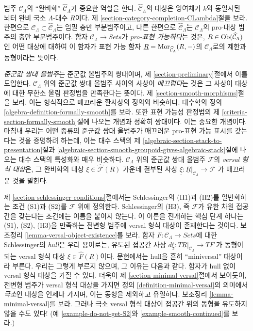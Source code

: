 \medskip\noindent
범주 $\mathcal{C}_\Lambda$의 ``완비화''
$\widehat{\mathcal{C}}_\Lambda$가 중요한 역할을 한다.
$\widehat{\mathcal{C}}_\Lambda$의 대상은 잉여체가 $k$와 동일시된 뇌터 완비
국소 $\Lambda$-대수 $R$이다. 제
\ref{section-category-completion-CLambda}절을 보라.
한편으로 $\mathcal{C}_\Lambda \subset \widehat{\mathcal{C}}_\Lambda$는
엄밀 충만 부분범주이고, 다른 한편으로
$\widehat{\mathcal{C}}_\Lambda$는 $\mathcal{C}_\Lambda$의
pro-대상 범주의 충만 부분범주이다. 함자
$\mathcal{C}_\Lambda \to \textit{Sets}$가 {\it pro-표현 가능하다}는 것은,
$R \in \mathop{\mathrm{Ob}}\nolimits(\widehat{\mathcal{C}}_\Lambda)$인 어떤 대상에 대하여 이 함자가
표현 가능 함자
$\underline{R} = \mathop{\mathrm{Mor}}\nolimits_{\widehat{\mathcal{C}}_\Lambda}(R, -)$의
$\mathcal{C}_\Lambda$로의 제한과 동형이라는 뜻이다.

\medskip\noindent
{\it 준군값 쌍대 올범주}는 준군값 올범주의 쌍대이며, 제
\ref{section-preliminary}절에서 이를 도입한다.
$\mathcal{C}_\Lambda$ 위의 준군값 쌍대 올범주 사이의 사상이
{\it 매끄럽다}는 것은 그 사상이 대상에 대한 무한소 올림 판정법을 만족한다는
뜻이다. 제 \ref{section-smooth-morphisms}절을 보라.
이는 형식적으로 매끄러운 환사상의 정의와 비슷하다. 대수학의 정의
\ref{algebra-definition-formally-smooth}를 보라. 또한 표현 가능성 판정법의
제 \ref{criteria-section-formally-smooth}절에 나오는 개념과 정확히 쌍대이다.
이는 중요한 개념이다. 마침내 우리는 어떤 종류의 준군값 쌍대 올범주가 매끄러운
pro-표현 가능 표시를 갖는다는 것을 증명하려 하는데, 이는 대수 스택의 제
\ref{algebraic-section-stack-to-presentation}절과
\ref{algebraic-section-smooth-groupoid-gives-algebraic-stack}절에 나오는
대수 스택의 특성화와 매우 비슷하다.
$\mathcal{C}_\Lambda$ 위의 준군값 쌍대 올범주 $\mathcal{F}$의
{\it versal 형식 대상}은, 그 완비화의 대상
$\xi \in \widehat{\mathcal{F}}(R)$ 가운데 결부된 사상
$\underline{\xi} : \underline{R}|_{\mathcal{C}_\Lambda} \to \mathcal{F}$
가 매끄러운 것을 말한다.

\medskip\noindent
제 \ref{section-schlessinger-conditions}절에서는 Schlessinger의
(H1)과 (H2)를 일반화하는 조건 (S1)과 (S2)를 $\mathcal{F}$ 위에 정의한다.
Schlessinger의 (H3), 즉 $\mathcal{F}$가 유한 차원 접공간을 갖는다는 조건에는
이름을 붙이지 않는다. 이 이론을 전개하는 핵심 단계 하나는 (S1), (S2), (H3)을
만족하는 전변형 범주에 versal 형식 대상이 존재한다는 것이다. 보조정리
\ref{lemma-versal-object-existence}를 보라.
함자 $F : \mathcal{C}_\Lambda \to \textit{Sets}$에 대한 Schlessinger의
{\it hull}은 우리 용어로는, 유도된 접공간 사상
$d\underline{\xi} : T\underline{R}|_{\mathcal{C}_\Lambda} \to TF$
가 동형이 되는 versal 형식 대상
$\xi \in \widehat{F}(R)$이다.
문헌에서는 hull을 흔히 ``miniversal'' 대상이라 부른다. 우리는 그렇게 부르지
않으며, 그 이유는 다음과 같다. 함자가 hull 없이 versal 형식 대상을 가질 수 있다.
더욱이 제 \ref{section-minimal-versal}절에서 보이듯이, 전변형 범주가 versal
형식 대상을 가지면 정의 \ref{definition-minimal-versal}의 의미에서
{\it 극소}인 대상을 언제나 가지며, 이는 동형을 제외하고 유일하다. 보조정리
\ref{lemma-minimal-versal}를 보라.
그러나 극소 versal 형식 대상이 접공간 위의 동형을 유도하지 않을 수도 있다!
(예 \ref{example-do-not-get-S2}와
\ref{example-smooth-continued}를 보라.)

